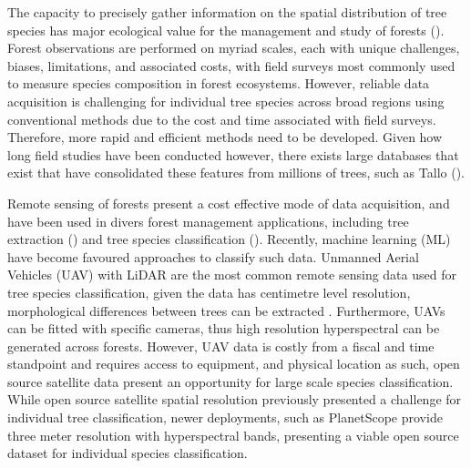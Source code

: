\documentclass[9pt,lineno]{elife}
\begin{document}
The capacity to precisely gather information on the spatial distribution of tree species has major ecological value for the management and study of forests (\cite{Fassnacht_2016}). Forest observations are performed on myriad scales, each with unique challenges, biases, limitations, and associated costs, with field surveys most commonly used to measure species composition in forest ecosystems. However, reliable data acquisition is challenging for individual tree species across broad regions using conventional methods due to the cost and time associated with field surveys. Therefore, more rapid and efficient methods need to be developed. Given how long field studies have been conducted however, there exists large databases that exist that have consolidated these features from millions of trees, such as Tallo (\cite{Jucker_Loubota_2022}).

Remote sensing of forests present a cost effective mode of data acquisition, and have been used in divers forest management applications, including tree extraction (\cite{Ocer_2020}) and tree species classification (\cite{Descals_Szantoi_Meijaard_Sutikno_Rindanata_Wich_2019, Ma_Liu_Liu_Zeng_Li_2021}).  Recently, machine learning (ML) have become favoured approaches to classify such data. Unmanned Aerial Vehicles (UAV) with LiDAR are the most common remote sensing data used for tree species classification, given the data has centimetre level resolution, morphological differences between trees can be extracted . Furthermore, UAVs can be fitted with specific cameras, thus high resolution hyperspectral can be generated across forests. However, UAV data is costly from a fiscal and time standpoint and requires access to equipment, and physical location as such, open source satellite data present an opportunity for large scale species classification. While open source satellite spatial resolution previously presented a challenge for individual tree classification, newer deployments, such as PlanetScope \cite{planetscope} provide three meter resolution with hyperspectral bands, presenting a viable open source dataset for individual species classification.
\end{document}
